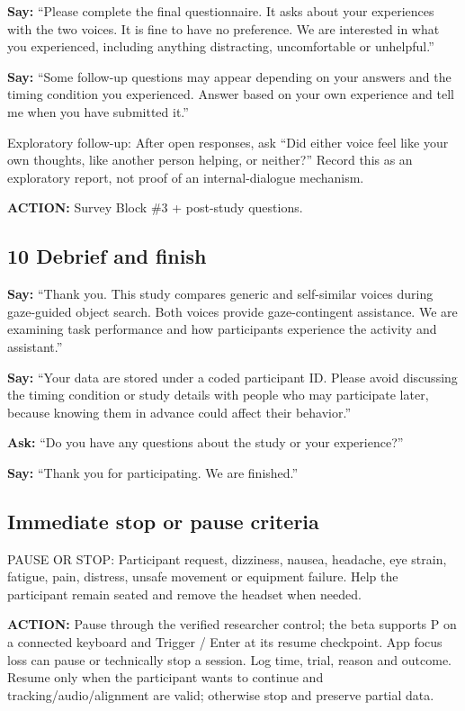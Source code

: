 \textbf{Say:} ``Please complete the final questionnaire. It asks about your
experiences with the two voices. It is fine to have no preference. We
are interested in what you experienced, including anything distracting,
uncomfortable or unhelpful.''

\textbf{Say:} ``Some follow-up questions may appear depending on your answers and
the timing condition you experienced. Answer based on your own
experience and tell me when you have submitted it.''

Exploratory follow-up: After open responses, ask ``Did either voice feel
like your own thoughts, like another person helping, or neither?''
Record this as an exploratory report, not proof of an internal-dialogue
mechanism.

\textbf{ACTION:} Survey Block \#3 + post-study questions.

\subsection{10 Debrief and finish}\label{debrief-and-finish}

\textbf{Say:} ``Thank you. This study compares generic and self-similar voices
during gaze-guided object search. Both voices provide gaze-contingent
assistance. We are examining task performance and how participants
experience the activity and assistant.''

\textbf{Say:} ``Your data are stored under a coded participant ID. Please avoid
discussing the timing condition or study details with people who may
participate later, because knowing them in advance could affect their
behavior.''

\textbf{Ask:} ``Do you have any questions about the study or your experience?''

\textbf{Say:} ``Thank you for participating. We are finished.''

\subsection{Immediate stop or pause
criteria}\label{immediate-stop-or-pause-criteria}

PAUSE OR STOP: Participant request, dizziness, nausea, headache, eye
strain, fatigue, pain, distress, unsafe movement or equipment failure.
Help the participant remain seated and remove the headset when needed.

\textbf{ACTION:} Pause through the verified researcher control; the beta supports
P on a connected keyboard and Trigger / Enter at its resume checkpoint.
App focus loss can pause or technically stop a session. Log time, trial,
reason and outcome. Resume only when the participant wants to continue
and tracking/audio/alignment are valid; otherwise stop and preserve
partial data.

